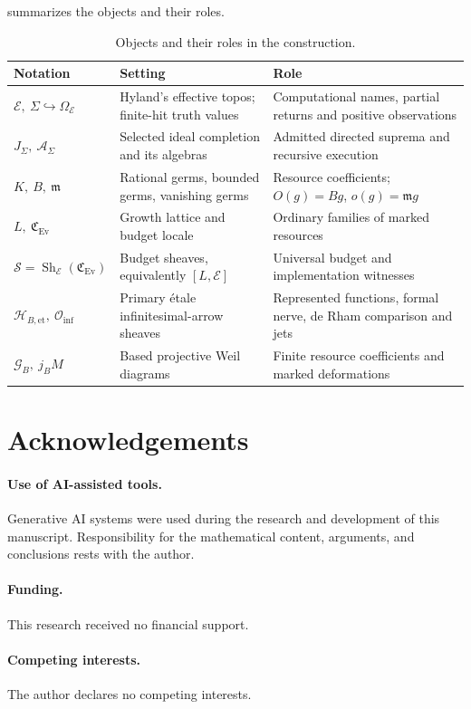 \documentclass[11pt,a4paper]{article}
\numberwithin{algorithm}{section}
\numberwithin{equation}{section}
\theoremstyle{definition}
\theoremstyle{remark}
\theoremstyle{plain}
\newcommand{\E}{\mathcal E}
\newcommand{\Truth}{\Omega_{\E}}
\newcommand{\AS}{\mathcal A_{\Sigma}}
\newcommand{\J}{J_{\Sigma}}
\newcommand{\incl}{\hookrightarrow}
\newcommand{\Ev}{{\operatorname{Ev}}}
\newcommand{\Geo}{\mathcal G_B}
\newcommand{\ThickEt}{\mathscr H_{B,\mathrm{et}}}
\newcommand{\Cplx}{\mathfrak C_{\Ev}}
\newcommand{\Sh}{\operatorname{Sh}}
\theoremstyle{definition}
\theoremstyle{plain}
\begin{document}
 summarizes the objects and their roles.

\begin{table}[H]
\centering
\caption{Objects and their roles in the construction.}
\label{tab:settings}
\begin{tabular}{@{}L{.23\textwidth}L{.34\textwidth}L{.35\textwidth}@{}}
\toprule
Notation & Setting & Role\\
\midrule
$\E,\ \Sigma\incl\Truth$ &
Hyland's effective topos; finite-hit truth values &
Computational names, partial returns and positive observations\\
$\J,\ \AS$ &
Selected ideal completion and its algebras &
Admitted directed suprema and recursive execution\\
$K,\ B,\ \mathfrak m$ &
Rational germs, bounded germs, vanishing germs &
Resource coefficients; $O(g)=Bg$, $o(g)=\mathfrak m g$\\
$L,\ \Cplx$ &
Growth lattice and budget locale &
Ordinary families of marked resources\\
$\mathscr S=\Sh_\E(\Cplx)$ &
Budget sheaves, equivalently $[L,\E]$ &
Universal budget and implementation witnesses\\
$\ThickEt,\ \mathcal O_{\mathrm{inf}}$ &
Primary \'etale infinitesimal-arrow sheaves &
Represented functions, formal nerve, de Rham comparison and jets\\
$\Geo,\ j_BM$ &
Based projective Weil diagrams &
Finite resource coefficients and marked deformations\\
\bottomrule
\end{tabular}
\end{table}

\section*{Acknowledgements}
\paragraph{Use of AI-assisted tools.} Generative AI systems were used during the research and development of this manuscript. Responsibility for the mathematical content, arguments, and conclusions rests with the author.

\paragraph{Funding.}
This research received no financial support.
\paragraph{Competing interests.}
The author declares no competing interests.
\end{document}

